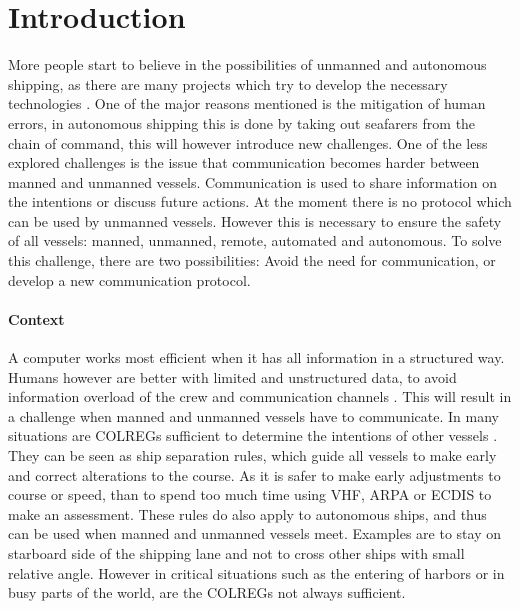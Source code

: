 \chapter*{Introduction}
\label{sec:introduction}

More people start to believe in the possibilities of unmanned and autonomous shipping, as there are many projects which try to develop the necessary technologies \cite{SMASH2017} \cite{Eriksen2017} \cite{MUNIN2016} \cite{Sames2017} \cite{RollsRoyce2015} \cite{Waterborne2016}. One of the major reasons mentioned is the mitigation of human errors, in autonomous shipping this is done by taking out seafarers from the chain of command, this will however introduce new challenges. One of the less explored challenges is the issue that communication becomes harder between manned and unmanned vessels. Communication is used to share information on the intentions or discuss future actions. At the moment there is no protocol which can be used by unmanned vessels. However this is necessary to ensure the safety of all vessels: manned, unmanned, remote, automated and autonomous. To solve this challenge, there are two possibilities: Avoid the need for communication, or develop a new communication protocol.

\subsubsection*{Context}
A computer works most efficient when it has all information in a structured way. Humans however are better with limited and unstructured data, to avoid information overload of the crew and communication channels \cite{CCNR2017}. This will result in a challenge when manned and unmanned vessels have to communicate.
In many situations are \acf{COLREGs} sufficient to determine the intentions of other vessels \cite{IMO1972}. They can be seen as ship separation rules, which guide all vessels to make early and correct alterations to the course. As it is safer to make early adjustments to course or speed, than to spend too much time using \ac{VHF}, \ac{ARPA} or \ac{ECDIS} to make an assessment. These rules do also apply to autonomous ships, and thus can be used when manned and unmanned vessels meet.
Examples are to stay on starboard side of the shipping lane and not to cross other ships with small relative angle. However in critical situations such as the entering of harbors or in busy parts of the world, are the \ac{COLREGs} not always sufficient.

